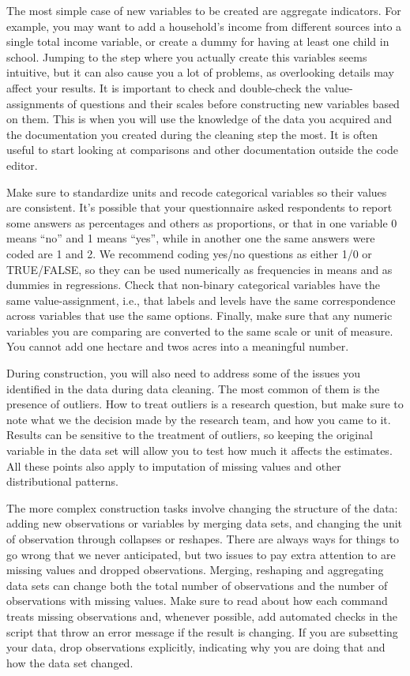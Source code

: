 The most simple case of new variables to be created are aggregate indicators. 
For example, you may want to add a household's income from different sources into a single total income variable, or create a dummy for having at least one child in school.
Jumping to the step where you actually create this variables seems intuitive,
but it can also cause you a lot of problems, as overlooking details may affect your results.
It is important to check and double-check the value-assignments of questions and their scales before constructing new variables based on them.
This is when you will use the knowledge of the data you acquired and the documentation you created during the cleaning step the most.
It is often useful to start looking at comparisons and other documentation outside the code editor.

Make sure to standardize units and recode categorical variables so their values are consistent.
It's possible that your questionnaire asked respondents to report some answers as percentages and others as proportions,
or that in one variable 0 means ``no'' and 1 means ``yes'', while in another one the same answers were coded are 1 and 2.
We recommend coding yes/no questions as either 1/0 or TRUE/FALSE, so they can be used numerically as frequencies in means and as dummies in regressions.
Check that non-binary categorical variables have the same value-assignment, i.e., 
that labels and levels have the same correspondence across variables that use the same options.
Finally, make sure that any numeric variables you are comparing are converted to the same scale or unit of measure. You cannot add one hectare and twos acres into a meaningful number.

During construction, you will also need to address some of the issues you identified in the data during data cleaning. 
The most common of them is the presence of outliers.
How to treat outliers is a research question, but make sure to note what we the decision made by the research team, and how you came to it. 
Results can be sensitive to the treatment of outliers, so keeping the original variable in the data set will allow you to test how much it affects the estimates.
All these points also apply to imputation of missing values and other distributional patterns.

The more complex construction tasks involve changing the structure of the data:
adding new observations or variables by merging data sets, 
and changing the unit of observation through collapses or reshapes.
There are always ways for things to go wrong that we never anticipated, but two issues to pay extra attention to are missing values and dropped observations. 
Merging, reshaping and aggregating data sets can change both the total number of observations and the number of observations with missing values.
Make sure to read about how each command treats missing observations and, whenever possible, add automated checks in the script that throw an error message if the result is changing.
If you are subsetting your data, drop observations explicitly, indicating why you are doing that and how the data set changed.

